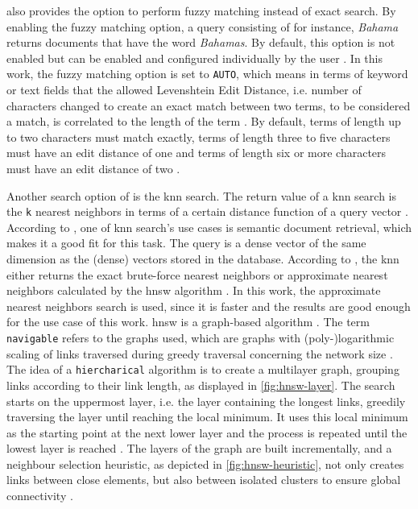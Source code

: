 \databaseName{} also provides the option to perform fuzzy matching instead of exact search.
By enabling the fuzzy matching option, a \databaseName{} query consisting of for instance, \textit{Bahama} returns documents that have the word \textit{Bahamas}.
By default, this option is not enabled but can be enabled and configured individually by the user \cite{Elasticsearch-match}.
In this work, the fuzzy matching option is set to \texttt{AUTO}, which means in terms of keyword or text fields that the allowed Levenshtein Edit Distance, 
i.e. number of characters changed to create an exact match between two terms, to be considered a match, is correlated to the length of the term \cite{Elasticsearch-fuzziness}.
By default, terms of length up to two characters must match exactly, terms of length three to five characters must have an edit distance of one and 
terms of length six or more characters must have an edit distance of two \cite{Elasticsearch-fuzziness}.

Another search option of \databaseName{} is the \ac{knn} search.
The return value of a \ac{knn} search is the \texttt{k} nearest neighbors in terms of a certain distance function of a query vector \cite{Elasticsearch-kNN-HNSW}.
According to \citeauthor{Elasticsearch-kNN-HNSW}, one of \ac{knn} search's use cases is semantic document retrieval, which makes it a good fit for this task.
The query is a dense vector of the same dimension as the (dense) vectors stored in the database.
According to \cite{Elasticsearch-knn}, the \ac{knn} either returns the exact brute-force nearest neighbors or approximate nearest neighbors calculated by the \ac{hnsw} algorithm \cite{Elasticsearch-kNN-HNSW, Elasticsearch-knn}.
In this work, the approximate nearest neighbors search is used, since it is faster and the results are good enough for the use case of this work.
\ac{hnsw} is a graph-based algorithm \cite{Elasticsearch-kNN-HNSW}.
The term \texttt{navigable} refers to the graphs used, which are graphs with (poly-)logarithmic scaling of links traversed during greedy traversal concerning the network size \cite{Elasticsearch-kNN-HNSW}.
The idea of a \texttt{hiercharical} algorithm is to create a multilayer graph, grouping links according to their link length, as displayed in \autoref{fig:hnsw-layer}. 
The search starts on the uppermost layer, i.e. the layer containing the longest links, greedily traversing the layer until reaching the local minimum.
It uses this local minimum as the starting point at the next lower layer and the process is repeated until the lowest layer is reached \cite{Elasticsearch-kNN-HNSW}.
The layers of the graph are built incrementally, and a neighbour selection heuristic, as depicted in \autoref{fig:hnsw-heuristic}, not only creates links between close elements, 
but also between isolated clusters to ensure global connectivity \cite{Elasticsearch-kNN-HNSW}.

